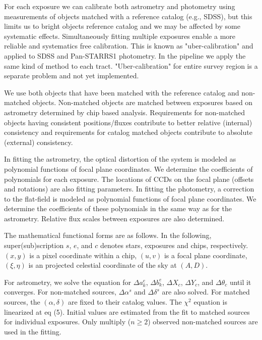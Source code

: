 \documentclass[12pt]{article}
\begin{document}
{For each exposure we can calibrate both astrometry and photometry using measurements of objects
matched with a reference catalog (e.g., SDSS), but this limits us to bright objects reference catalog and
we may be affected by some systematic effects. Simultaneously fitting multiple exposures enable a more
reliable and systematics free calibration. This is known as "uber-calibration" and
applied to SDSS \citep{2008ApJ...674.1217P} and Pan-STARRS1 \citep{2012ApJ...756..158S} photometry.
In the pipeline we apply the same kind of method
to each tract. "Uber-calibration" for entire survey region is a separate problem and not yet implemented.

We use both objects that have been matched with the reference catalog and non-matched objects.
Non-matched objects are matched between exposures based on astrometry determined
by chip based analysis. Requirements for non-matched objects having consistent positions/fluxes
contribute to better relative (internal) consistency and requirements for catalog matched objects
contribute to absolute (external) consistency.

In fitting the astrometry, the optical distortion of the system is modeled as polynomial functions of
focal plane coordinates.
We determine the coefficients of polynomials for each exposure. The locations of CCDs on the focal plane
(offsets and rotations) are also fitting parameters.
In fitting the photometry, a correction to the flat-field is modeled as polynomial functions of
focal plane coordinates.
We determine the coefficients of these polynomials in the same way as for the astrometry.  Relative flux
scales between exposures
are also determined.

The mathematical functional forms are as follows.
In the following, super(sub)scription $s$, $e$, and $c$ denotes stars, exposures and chips, respectively.
$(x,y)$ is a pixel coordinate within a chip, $(u,v)$ is a focal plane coordinate, $(\xi,\eta)$ is an projected
celestial coordinate of the sky at $(A,D)$.

For astrometry, we solve the equation for $\Delta a_k^e$, $\Delta b_k^e$, $\Delta X_c$, $\Delta Y_c$, and
$\Delta\theta_c$ until it converges. For non-matched sources, $\Delta\alpha^s$ and $\Delta\delta^s$ are also
solved.  For matched sources, the $(\alpha, \delta)$ are fixed to their catalog values.
The $\chi^2$ equation is linearized at eq (5). Initial values are estimated from the fit to matched sources for
individual exposures. Only multiply ($n\ge2$) observed non-matched sources are used in the fitting.

}
\end{document}
